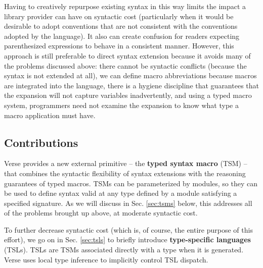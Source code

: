 Having to creatively repurpose existing syntax in this way limits the impact a library provider can have on syntactic cost (particularly when it would be desirable to adopt conventions that are not consistent with the conventions adopted by the language). It also can create confusion for readers expecting parenthesized expressions to behave in a consistent manner. However,  this approach is still preferable to direct syntax extension because it avoids many of the problems discussed above: there cannot be syntactic conflicts (because the syntax is not extended at all), we can define macro abbreviations because macros are integrated into the language, there is a hygiene discipline that guarantees that the expansion will not capture variables inadvertently, and using a typed macro system, programmers need not examine the expansion to know what type a macro application must have. 


\subsection{Contributions}\label{sec:syntax-contributions}
Verse provides a new external primitive -- the \textbf{typed syntax macro} (TSM) -- that combines the syntactic flexibility of syntax extensions with the reasoning guarantees of typed macros. TSMs can be parameterized by modules, so they can be used to define syntax valid at any type defined by a module satisfying a specified signature. As we will discuss in Sec. \ref{sec:tsms} below, this addresses all of the problems brought up above, at moderate syntactic cost.

To further decrease syntactic cost (which is, of course, the entire purpose of this effort), we go on in Sec. \ref{sec:tsls} to briefly introduce \textbf{type-specific languages} (TSLs). TSLs are TSMs associated directly with a type when it is generated. Verse uses local type inference to implicitly control TSL dispatch.

